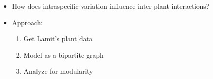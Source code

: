 \documentclass[12pt]{article}
\begin{document}
\begin{itemize}
\item How does intraspecific variation influence inter-plant interactions?
\item Approach:
  \begin{enumerate}
  \item Get Lamit's plant data
  \item Model as a bipartite graph
  \item Analyze for modularity
  \end{enumerate}
\end{itemize}


  

\end{document}

